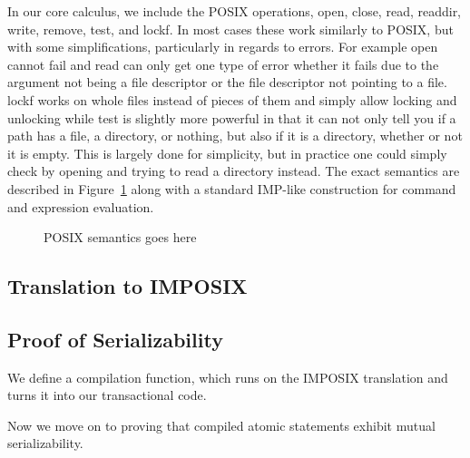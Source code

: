 In our core calculus, we include the POSIX operations,
open, close, read, readdir, write, remove, test, and lockf.
In most cases these work similarly to POSIX, but with some simplifications,
particularly in regards to errors. For example open cannot fail and
read can only get one type of error whether it fails due to the argument
not being a file descriptor or the file descriptor not pointing to a file.
lockf works on whole files instead of pieces of them and simply allow 
locking and unlocking while test is slightly more powerful in that it
can not only tell you if a path has a file, a directory, or nothing,
but also if it is a directory, whether or not it is empty. 
This is largely done for simplicity, but in practice one could
simply check by opening and trying to read a directory instead. The
exact semantics are described in Figure~\ref{fig:posix-semantics}
along with a standard IMP-like construction for command and
expression evaluation.

\begin{figure}
\caption{POSIX semantics goes here}
\label{fig:posix-semantics}
\end{figure}

\subsection{Translation to IMPOSIX}
\label{subsec:posix-translation}



\subsection{Proof of Serializability}
\label{subsec:posix-proof}

We define a compilation function, which runs on the IMPOSIX translation
and turns it into our transactional code.



Now we move on to proving that compiled atomic statements exhibit mutual
serializability.
